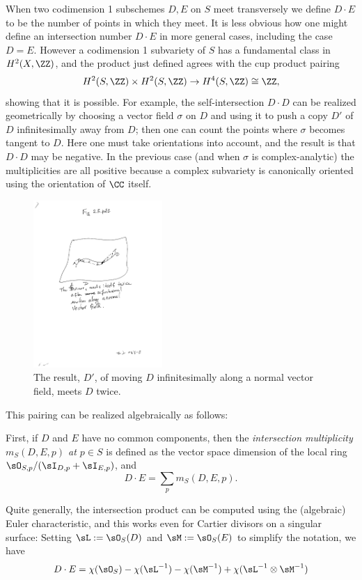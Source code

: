 When two codimension 1 subschemes $D,E$ on $S$ meet transversely we define $D\cdot E$ to be the number of points in which they meet.  
It is less obvious how one might define an intersection number $D\cdot E$ in more general cases,
including the case $D=E$. However 
a codimension 1 subvariety of $S$ has a fundamental class in $H^{2}(X,\ZZ)$, and the product just defined
agrees with the cup product pairing 
$$
H^{2}(S,\ZZ) \times H^{2}(S,\ZZ) \to H^4(S,\ZZ)\cong \ZZ,
$$
showing that it is possible. For example, the self-intersection $D\cdot D$ can be realized geometrically
 by choosing a  vector field $\sigma$ on $D$ and using it to push a copy $D'$ of $D$ infinitesimally away from $D$; then
 one can count the points where $\sigma$ becomes tangent to $D$. Here one must take orientations into account,
 and the result is that $D\cdot D$ may be negative. In the previous case (and when $\sigma$ is complex-analytic)
 the multiplicities are all positive because a complex subvariety is canonically oriented using the orientation of $\CC$
 itself.
\begin{figure}[htbp]
\begin{center}
\centerline {\includegraphics[height=2.5in]{"Fig2.3.pdf"}}
 \caption{The result, $D'$, of moving $D$ infinitesimally along a normal vector field, meets  $D$ twice. }
\label{Fig2.3}
\end{center}
\end{figure}


This pairing can be realized algebraically as follows:

First, if $D$ and $E$ have no common
components, then the \emph{intersection multiplicity $m_S(D,E,p)$ at $p\in S$}
is defined as the vector space dimension of the local ring $\sO_{S,p}/(\sI_{D,p}+\sI_{E,p})$, and 
$$
D\cdot E = \sum_p m_S(D,E,p).
$$

Quite generally, 
the intersection product can be computed using the (algebraic) Euler characteristic, and this works even for Cartier divisors on a singular surface: Setting $\sL := \sO_S(D)$ and
$\sM := \sO_S(E)$ to simplify the notation, we have 
$$
D\cdot E = \chi(\sO_S)-\chi(\sL^{-1}) -\chi(\sM^{-1}) +\chi(\sL^{-1}\otimes \sM^{-1}) 
$$

